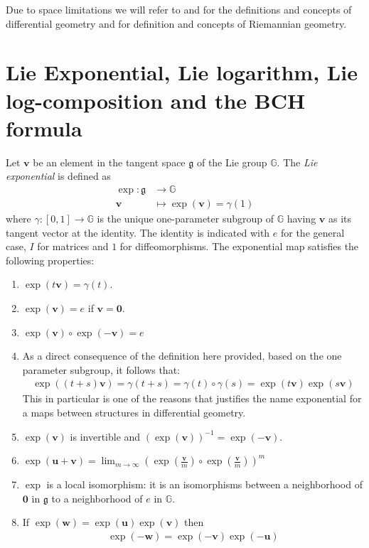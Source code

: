 Due to space limitations we will refer to \cite{do1976differential} and \cite{lee2012introduction} for the definitions and concepts of differential geometry and \cite{do1992riemannian} for definition and concepts of Riemannian geometry.

\section{Lie Exponential, Lie logarithm, Lie log-composition and the BCH formula}\label{se:lie_exp_log_comp_bch}
Let $\mathbf{v}$ be an element in the tangent space $\mathfrak{g}$ of the Lie group $\mathbb{G}$.
The \emph{Lie exponential} is defined as 
\begin{align*}
\exp :  \mathfrak{g} & \longrightarrow  \mathbb{G}  \\
\mathbf{v} &\longmapsto  \exp(\mathbf{v} ) = \gamma(1) %
\end{align*}
where $\gamma: [0,1]\rightarrow \mathbb{G} $ is the unique one-parameter subgroup of $\mathbb{G}$ having $\mathbf{v}$ as its tangent vector at the identity. The identity is indicated with $e$ for the general case, $I$ for matrices and $1$ for diffeomorphisms.
The exponential map satisfies the following properties:
\begin{enumerate}
	\item $\exp(t\mathbf{v}) =\gamma(t) $.
	\item $\exp(\mathbf{v}) = e$ if $\mathbf{v} = \mathbf{0}$.
	\item $\exp(\mathbf{v})\circ \exp(\mathbf{-v})  = e$
	\item As a direct consequence of the definition here provided, based on the one parameter subgroup, it follows that:
	\begin{align*}
	\exp((t+s)\mathbf{v}) = \gamma(t+s) = \gamma(t)\circ \gamma(s) = \exp(t\mathbf{v})\exp(s\mathbf{v})
	\end{align*}
	This in particular is one of the reasons that justifies the name exponential for a maps between structures in differential geometry.
	\item $\exp(\mathbf{v})$ is invertible and $(\exp(\mathbf{v}))^{-1} = \exp(-\mathbf{v})$.
		\item  $\exp(\mathbf{u} + \mathbf{v}) =\lim_{m\rightarrow \infty} (\exp(\frac{\mathbf{v}}{m}) \circ\exp(\frac{\mathbf{v}}{m}))^{m}$
	\item $\exp$ is a local isomorphism: it is an isomorphisms between a neighborhood of $\mathbf{0}$ in $\mathfrak{g}$ to a neighborhood of $e$ in $\mathbb{G}$.
	\item If $\exp(\mathbf{w}) = \exp(\mathbf{u})  \exp(\mathbf{v})$ then 
	\begin{align}\label{prop:lie_inversion_property}
	\exp(\mathbf{-w}) = \exp(\mathbf{-v}) \exp(\mathbf{-u})
	\end{align}
\end{enumerate}
